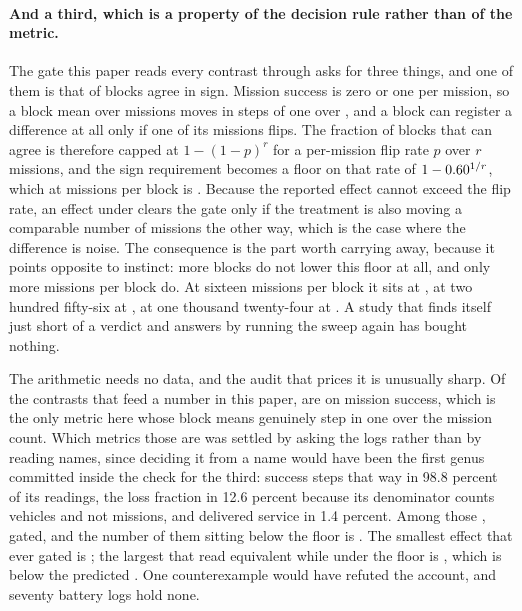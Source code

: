 \documentclass[11pt]{article}
\begin{document}
\paragraph{And a third, which is a property of the decision rule rather than of the metric.} The gate this paper reads every contrast through asks for three things, and one of them is that \FlSign{} of blocks agree in sign. Mission success is zero or one per mission, so a block mean over \FlReps{} missions moves in steps of one over \FlReps{}, and a block can register a difference at all only if one of its missions flips. The fraction of blocks that can agree is therefore capped at $1-(1-p)^{r}$ for a per-mission flip rate $p$ over $r$ missions, and the sign requirement becomes a floor on that rate of $1 - 0.60^{1/r}$, which at \FlReps{} missions per block is \FlFloor{}. Because the reported effect cannot exceed the flip rate, an effect under \FlFloor{} clears the gate only if the treatment is also moving a comparable number of missions the other way, which is the case where the difference is noise. The consequence is the part worth carrying away, because it points opposite to instinct: more blocks do not lower this floor at all, and only more missions per block do. At sixteen missions per block it sits at \FlFloorSixteen{}, at two hundred fifty-six at \FlFloorTwoFiftySix{}, at one thousand twenty-four at \FlFloorTenTwentyFour{}. A study that finds itself just short of a verdict and answers by running the sweep again has bought nothing.

The arithmetic needs no data, and the audit that prices it is unusually sharp. Of the \FlPublished{} contrasts that feed a number in this paper, \FlCounted{} are on mission success, which is the only metric here whose block means genuinely step in one over the mission count. Which metrics those are was settled by asking the logs rather than by reading names, since deciding it from a name would have been the first genus committed inside the check for the third: success steps that way in 98.8 percent of its readings, the loss fraction in 12.6 percent because its denominator counts vehicles and not missions, and delivered service in 1.4 percent. Among those \FlCounted{}, \FlGated{} gated, and the number of them sitting below the floor is \FlGatedBelow{}. The smallest effect that ever gated is \FlSmallestGated{}; the largest that read equivalent while under the floor is \FlLargestEqBelow{}, which is \FlMargin{} below the predicted \FlFloor{}. One counterexample would have refuted the account, and seventy battery logs hold none.
\end{document}
